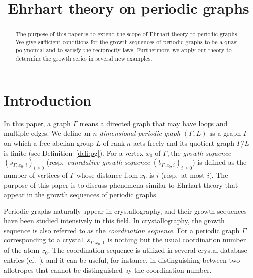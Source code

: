 \documentclass[ALCO,published]{cedram}
\title
[Ehrhart theory on periodic graphs]
{Ehrhart theory on periodic graphs}
\author[\initial{T.} Inoue]{\firstname{Takuya} \lastname{Inoue}}
\author[\initial{Y.} Nakamura]{\firstname{Yusuke} \lastname{Nakamura}}
\theoremstyle{remark}
\begin{document}
\newtheorem{com}[cdrthm]{Comment}
\newtheorem{prob}[cdrthm]{Problem}
\newtheorem{claim}[cdrthm]{Claim}
\newtheorem{note}[cdrthm]{Note}
\newtheorem{case}{Case}
\newtheorem{step}{Step}

\theoremstyle{definition}
\newtheorem{setting}[cdrthm]{Setting}

\begin{abstract}
The purpose of this paper is to extend the scope of Ehrhart theory to periodic graphs. 
We give sufficient conditions for the growth sequences of periodic graphs to be a quasi-polynomial and to satisfy the reciprocity laws. 
Furthermore, we apply our theory to determine the growth series in several new examples. 
\end{abstract}


\maketitle

\section{Introduction}

In this paper, a graph $\Gamma$ means a directed graph that may have loops and multiple edges. 
We define an \textit{$n$-dimensional periodic graph} $(\Gamma, L)$ as a graph $\Gamma$ on which a free abelian group $L$ of rank $n$ acts freely and its quotient graph $\Gamma/L$ is finite (see Definition~\ref{defi:pg}). 
For a vertex $x_0$ of $\Gamma$, the \textit{growth sequence} $(s_{\Gamma, x_0, i})_{i \ge 0}$ 
(resp.\ \textit{cumulative growth sequence} $(b_{\Gamma, x_0, i})_{i \ge 0}$) is defined as the number of vertices of $\Gamma$ whose distance from $x_0$ is $i$ (resp.\ at most $i$). 
The purpose of this paper is to discuss phenomena similar to Ehrhart theory that appear in the growth sequences of periodic graphs. 

Periodic graphs naturally appear in crystallography, and their growth sequences have been studied intensively in this field. 
In crystallography, the growth sequence is also referred to as the \textit{coordination sequence}. 
For a periodic graph $\Gamma$ corresponding to a crystal, $s_{\Gamma, x_0, 1}$ is nothing but the usual coordination number of the atom $x_0$. 
The coordination sequence is utilized in several crystal database entries (cf.~\cite{DZS}), and it can be useful, for instance, in distinguishing between two allotropes that cannot be distinguished by the coordination number. 
\end{document}

